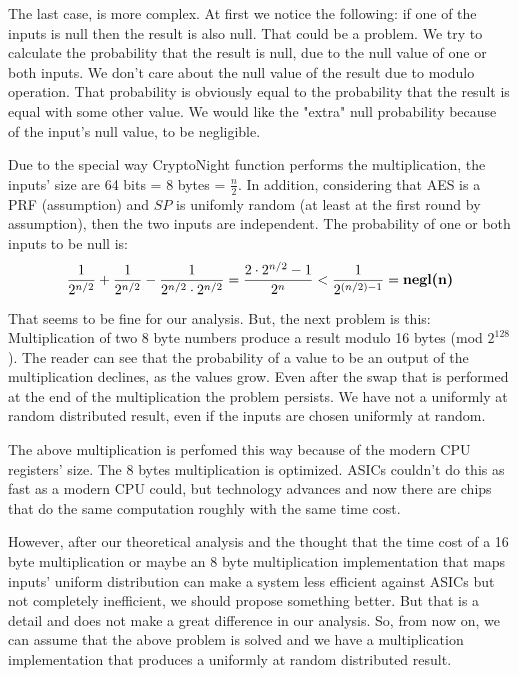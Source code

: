 The last case, is more complex. At first we notice the following: if one of the inputs is null then the result is also null. That could be a problem. We try to calculate the probability that the result is null, due to the null value of one or both inputs. We don't care about the null value of the result due to modulo operation. That probability is obviously equal to the probability that the result is equal with some other value. We would like the "extra" null probability because of the input's null value, to be negligible.

Due to the special way CryptoNight function performs the multiplication, the inputs' size are 64 bits = 8 bytes = $\frac{n}{2}$. In addition, considering that AES is a PRF (assumption) and $SP$ is unifomly random (at least at the first round by assumption), then the two inputs are independent. The probability of one or both inputs to be null is:
\begin{equation} \label{prob_zero}
  \frac{1}{2^{n/2}} + \frac{1}{2^{n/2}} - \frac{1}{2^{n/2} \cdot 2^{n/2}} = \frac{2\cdot2^{n/2}-1}{2^n} < \frac{1}{2^{(n/2)-1}} = \mbox{\textbf{negl(n)}}
\end{equation}

That seems to be fine for our analysis. But, the next problem is this: Multiplication of two 8 byte numbers produce a result modulo 16 bytes (mod $2^{128}$). The reader can see that the probability of a value to be an output of the multiplication declines, as the values grow. Even after the swap that is performed at the end of the multiplication the problem persists. We have not a uniformly at random distributed result, even if the inputs are chosen uniformly at random.

The above multiplication is perfomed this way because of the modern CPU registers' size. The 8 bytes multiplication is optimized. ASICs couldn't do this as fast as a modern CPU could, but technology advances and now there are chips that do the same computation roughly with the same time cost.

However, after our theoretical analysis and the thought that the time cost of a 16 byte multiplication or maybe an 8 byte multiplication implementation that maps inputs' uniform distribution can make a system less efficient against ASICs but not completely inefficient, we should propose something better. But that is a detail and does not make a great difference in our analysis. So, from now on, we can assume that the above problem is solved and we have a multiplication implementation that produces a uniformly at random distributed result.

